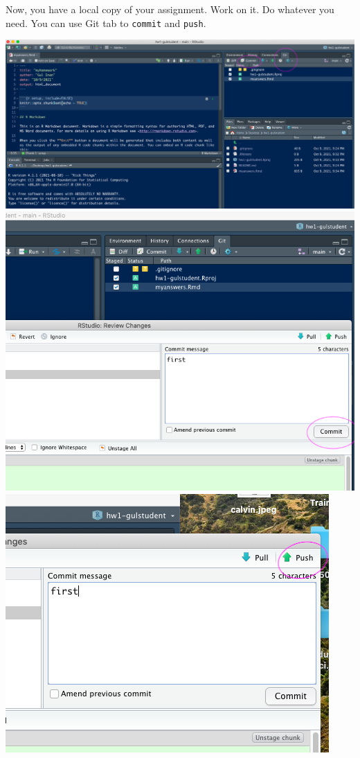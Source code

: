 \documentclass[
  12pt,
]{article}
\begin{document}
Now, you have a local copy of your assignment. Work on it. Do whatever
you need. You can use Git tab to \texttt{commit} and \texttt{push}.

\includegraphics[width=1\linewidth]{images/commit1}
\includegraphics[width=1\linewidth]{images/commit2}
\includegraphics[width=1\linewidth]{images/push}
\end{document}

